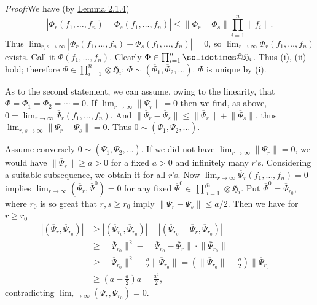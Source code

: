 \documentclass[12pt,b5paper,twoside]{article}
\makeatletter
\newcommand{\solidotimes}{\mathbin{\mathpalette\solidotimes@\relax}}
\newcommand{\solidotimes@}[2]{%
  \begingroup
  \setbox\z@=\hbox{$\m@th#1\bm{\otimes}$}%
  \@tempdima=.04\wd\z@
  \@tempdimb=.04\ht\z@
  \rlap{\kern-\@tempdima\copy\z@}%
  \rlap{\kern\@tempdima\copy\z@}%
  \rlap{\raise\@tempdimb\copy\z@}%
  \rlap{\lower\@tempdimb\copy\z@}%
  \box\z@
  \endgroup}
\newcommand{\Hspace}{\mathfrak H}
\newcommand{\Proof}{\par\noindent\textit{Proof:}\enspace}
\newcommand{\lemref}[1]{\hyperref[lem:#1]{Lemma #1}}
\makeatother
\begin{document}
\Proof We have (by \lemref{2.1.4})
\[
 |\overline{\Phi}_r(f_1,\ldots,f_n)
 -\overline{\Phi}_s(f_1,\ldots,f_n)|
 \leq\lVert\overline{\Phi}_r-\overline{\Phi}_s\rVert
 \prod_{i=1}^{n}\lVert f_i\rVert.
\]
Thus
$\lim_{r,s\to\infty}|\overline{\Phi}_r(f_1,\ldots,f_n)-
\overline{\Phi}_s(f_1,\ldots,f_n)|=0$, so
$\lim_{r\to\infty}\overline{\Phi}_r(f_1,\ldots,f_n)$ exists. Call it
$\Phi(f_1,\ldots,f_n)$. Clearly
$\Phi\in\prod_{i=1}^{n}\solidotimes\Hspace_i$. Thus (i), (ii) hold; therefore
$\Phi\in\prod_{i=1}^{n}\otimes\Hspace_i$;
$\Phi\sim(\overline{\Phi}_1,\overline{\Phi}_2,\ldots)$.
$\Phi$ is unique by (i).

As to the second statement, we can assume, owing to the linearity, that
$\Phi=\overline{\Phi}_1=\overline{\Phi}_2=\cdots=0$. If
$\lim_{r\to\infty}\lVert\overline{\Psi}_r\rVert=0$ then we find, as above,
$0=\lim_{r\to\infty}\overline{\Psi}_r(f_1,\ldots,f_n)$. And
$\lVert\overline{\Psi}_r-\overline{\Psi}_s\rVert
\leq\lVert\overline{\Psi}_r\rVert+
\lVert\overline{\Psi}_s\rVert$, thus
$\lim_{r,s\to\infty}\lVert\overline{\Psi}_r-
\overline{\Psi}_s\rVert=0$. Thus
$0\sim(\overline{\Psi}_1,\overline{\Psi}_2,\ldots)$.

Assume conversely $0\sim(\overline{\Psi}_1,\overline{\Psi}_2,\ldots)$.
If we did not have
$\lim_{r\to\infty}\lVert\overline{\Psi}_r\rVert=0$, we would have
$\lVert\overline{\Psi}_r\rVert\geq a>0$ for a fixed $a>0$ and infinitely
many $r$'s.
Considering a suitable subsequence, we obtain it for all $r$'s. Now
$\lim_{r\to\infty}\overline{\Psi}_r(f_1,\ldots,f_n)=0$ implies
$\lim_{r\to\infty}(\overline{\Psi}_r,\overline{\Psi}^{0})=0$ for any fixed
$\overline{\Psi}^{0}\in
\mathop{\prod\nolimits'}_{i=1}^{n}\otimes\Hspace_i$. Put
$\overline{\Psi}^{0}=\overline{\Psi}_{r_0}$, where $r_0$ is so great that
$r,s\geq r_0$ imply
$\lVert\overline{\Psi}_r-\overline{\Psi}_s\rVert\leq a/2$.
Then we have for $r\geq r_0$
\begin{align*}
 |(\overline{\Psi}_r,\overline{\Psi}_{r_0})|
 &\geq |(\overline{\Psi}_{r_0},\overline{\Psi}_{r_0})|
       -|(\overline{\Psi}_{r_0}-\overline{\Psi}_r,
          \overline{\Psi}_{r_0})|\\
 &\geq\lVert\overline{\Psi}_{r_0}\rVert^2
       -\lVert\overline{\Psi}_{r_0}-\overline{\Psi}_r\rVert
        \cdot\lVert\overline{\Psi}_{r_0}\rVert\\
 &\geq\lVert\overline{\Psi}_{r_0}\rVert^2
       -\frac a2\lVert\overline{\Psi}_{r_0}\rVert
  =\left(\lVert\overline{\Psi}_{r_0}\rVert-\frac a2\right)
       \lVert\overline{\Psi}_{r_0}\rVert\\
 &\geq\left(a-\frac a2\right)a=\frac{a^2}{2},
\end{align*}
contradicting
$\lim_{r\to\infty}(\overline{\Psi}_r,\overline{\Psi}_{r_0})=0$.
\end{document}
